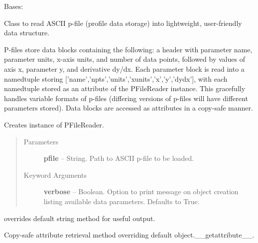 \documentclass[letterpaper,10pt,english]{sphinxmanual}
\begin{document}
\begin{fulllineitems}
\label{eqtools:eqtools.pfilereader.PFileReader}
Bases: 

Class to read ASCII p-file (profile data storage) into lightweight, user-friendly data structure.

P-files store data blocks containing the following: a header with parameter
name, parameter units, x-axis units, and number of data points, followed by values of
axis x, parameter y, and derivative dy/dx.  Each parameter block is read into a
namedtuple storing {[}'name','npts','units','xunits','x','y','dydx'{]}, with each namedtuple
stored as an attribute of the PFileReader instance.  This gracefully handles variable
formats of p-files (differing versions of p-files will have different parameters stored).
Data blocks are accessed as attributes in a copy-safe manner.

Creates instance of PFileReader.
\begin{quote}\begin{description}
\item[{Parameters }] \leavevmode
\textbf{pfile} --
String.  Path to ASCII p-file to be loaded.

\item[{Keyword Arguments}] \leavevmode
\textbf{verbose} --
Boolean.  Option to print message on object creation
listing available data parameters.  Defaults to True.

\end{description}\end{quote}

\begin{fulllineitems}
\label{eqtools:eqtools.pfilereader.PFileReader.__str__}
overrides default string method for useful output.

\end{fulllineitems}


\begin{fulllineitems}
\label{eqtools:eqtools.pfilereader.PFileReader.__getattribute__}
Copy-safe attribute retrieval method overriding default object.\_\_getattribute\_\_.


\end{fulllineitems}
\end{fulllineitems}
\end{document}
